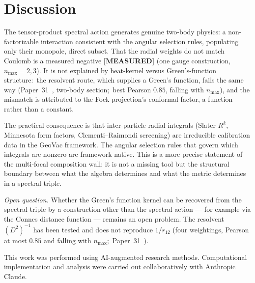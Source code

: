 \documentclass[twocolumn,pra,amsmath,amssymb,superscriptaddress]{revtex4-2}
\begin{document}
\section{Discussion}
\label{sec:discussion}

The tensor-product spectral action generates genuine two-body physics:
a non-factorizable interaction consistent with the angular selection
rules, populating only their monopole, direct subset. That the radial weights do not match Coulomb is a measured
negative \textbf{[MEASURED]} (one gauge construction, $n_{\max} = 2,
3$). It is not explained by heat-kernel versus Green's-function
structure:\ the resolvent route, which supplies a Green's function,
fails the same way (Paper~31~\cite{paper31}, two-body section;\
best Pearson $0.85$, falling with $n_{\max}$), and the mismatch is
attributed to the Fock projection's conformal factor, a function rather
than a constant.

The practical consequence is that inter-particle radial integrals
(Slater $R^k$, Minnesota form factors, Clementi--Raimondi screening)
are irreducible calibration data in the GeoVac framework. The angular
selection rules that govern which integrals are nonzero are
framework-native. This is a more precise statement of the multi-focal
composition wall: it is not a missing tool but the structural boundary
between what the algebra determines and what the metric determines in
a spectral triple.

\emph{Open question.} Whether the Green's function kernel can be
recovered from the spectral triple by a construction other than the
spectral action --- for example via the Connes distance function ---
remains an open problem. The resolvent $(D^2)^{-1}$ has been tested and
does not reproduce $1/r_{12}$ (four weightings, Pearson at most $0.85$
and falling with $n_{\max}$;\ Paper~31~\cite{paper31}).

\begin{acknowledgments}
This work was performed using AI-augmented research methods.
Computational implementation and analysis were carried out
collaboratively with Anthropic Claude.
\end{acknowledgments}
\end{document}
